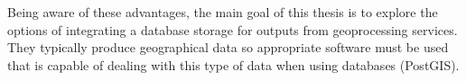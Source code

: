 	Being aware of these advantages, the main goal of this thesis is to explore the options of integrating a database storage for outputs from geoprocessing services. They typically produce geographical data so appropriate software must be used that is capable of dealing with this type of data when using databases (PostGIS).  

